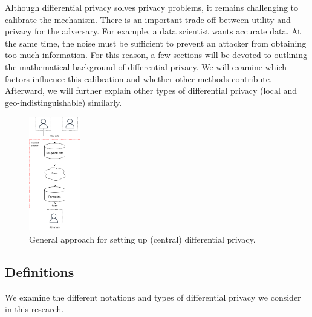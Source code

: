 Although differential privacy solves privacy problems, it remains challenging to calibrate the mechanism.
There is an important trade-off between utility and privacy for the adversary.
For example, a data scientist wants accurate data. At the same time, the noise must be sufficient to prevent an attacker from obtaining too much information.
For this reason, a few sections will be devoted to outlining the mathematical background of differential privacy.
We will examine which factors influence this calibration and whether other methods contribute.
Afterward, we will further explain other types of differential privacy (local and geo-indistinguishable) similarly.
\begin{figure}[h!]
  \includegraphics[width=0.2\textwidth]{TheorethicalFramework/Differential privacy/central-dp.png}
  \caption{General approach for setting up (central) differential privacy.}
  \label{fig:central-dp}
\end{figure}

\newpage
\subsection{Definitions}
We examine the different notations and types of differential privacy we consider in this research.

